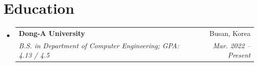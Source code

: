 \documentclass[letterpaper,10pt]{article}
\makeatletter
\newcommand{\resumeSubheading}[4]{
  \vspace{-3pt}\item
    \begin{tabular*}{0.97\textwidth}[t]{l@{\extracolsep{\fill}}r}
      \textbf{#1} & #2 \\
      \textit{\small#3} & \textit{\small #4} \\
    \end{tabular*}\vspace{-9pt}
}
\newcommand{\resumeSubHeadingListStart}{\begin{itemize}[leftmargin=0.15in, label={}]}
\newcommand{\resumeSubHeadingListEnd}{\end{itemize}}
\makeatother
\begin{document}
\section{Education}
  \resumeSubHeadingListStart

    \resumeSubheading
      {Dong-A University}{Busan, Korea}
      {B.S. in Department of Computer Engineering; GPA: 4.13 / 4.5}{Mar. 2022 -- Present}

  \resumeSubHeadingListEnd


\end{document}
